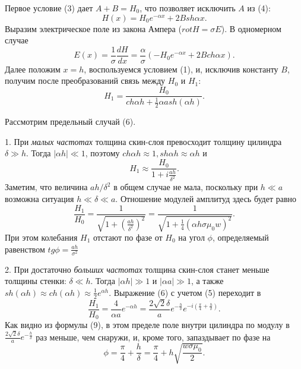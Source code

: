 \documentclass[a4paper,12pt]{report}
\begin{document}
Первое условие (3) дает \(A+B=H_{0}\), что позволяет исключить $A$ из (4):
\begin{equation*}
    H(x) = H_{0}e^{-\alpha x} + 2B sh\alpha x.
\end{equation*}
Выразим электрическое поле из закона Ампера (\(rot H = \sigma E\)). В одномерном случае
\begin{equation*}
    E(x) = \frac{1}{\sigma}\frac{dH}{dx} = \frac{\alpha}{\sigma}(-H_{0}e^{-\alpha x} + 2B ch\alpha x). 
\end{equation*}
Далее положим \(x=h\), воспользуемся условием (1), и, исключив константу $B$, получим после преобразований связь между $H_{0}$ и $H_{1}$:
\begin{equation}
    H_{1} = \frac{H_{0}}{ch\alpha h + \frac{1}{2} \alpha a sh(\alpha h)}.
\end{equation}

Рассмотрим предельный случай (6).

1. При \textit{малых частотах} толщина скин-слоя превосходит толщину цилиндра \(\delta \gg h\). Тогда \(|\alpha h| \ll 1\), поэтому \(ch\alpha h \approx 1, sh \alpha h \approx \alpha h\) и 
\begin{equation}
    H_{1} \approx \frac{H_{0}}{1 + i\frac{ah}{\delta^2} }.
\end{equation}
Заметим, что величина \(ah/\delta^2\) в общем случае не мала, поскольку при \(h\ll a\) возможна ситуация \(h\ll \delta\ll a\). Отношение модулей амплитуд здесь будет равно
\begin{equation}
   \frac{H_{1}}{H_{0}} = \frac{1}{\sqrt{1 + (\frac{ah}{\delta^2})^2 }} = \frac{1}{\sqrt{1+\frac{1}{4}(\alpha h\sigma\mu_{0} w)^2}}.
\end{equation}
При этом колебания $H_{1}$ отстают по фазе от $H_{0}$ на угол $\phi$, определяемый равенством \(tg\phi = \frac{ah}{\sigma^2}\)

2. При достаточно \textit{больших частотах} толщина скин-слоя станет меньше толщины стенки: \(\delta\ll h\). Тогда \(|\alpha h| \gg 1\) и \(|\alpha a| \gg 1\), а также \(sh(\alpha h)\approx ch(\alpha h)\approx \frac{1}{2}e^{\alpha h}\). Выражение (6) с учетом (5) переходит в 
\begin{equation}
   \frac{H_{1}}{H_{0}} = \frac{4}{\alpha a}e^{-\alpha h} = \frac{2\sqrt{2}\delta}{a}e^{-\frac{h}{\delta}}e^{-i(\frac{\pi}{4}+\frac{h}{\delta})}.
\end{equation}
Как видно из формулы (9), в этом пределе поле внутри цилиндра по модулу в \(\frac{2\sqrt{2}\delta}{a} e^{-\frac{h}{\delta}}\) раз меньше, чем снаружи, и, кроме того, запаздывает по фазе на
\begin{equation}
   \phi = \frac{\pi}{4}+\frac{h}{\delta}=\frac{\pi}{4}+h\sqrt{\frac{w\sigma\mu_{0}}{2}}.
\end{equation}
\end{document}
